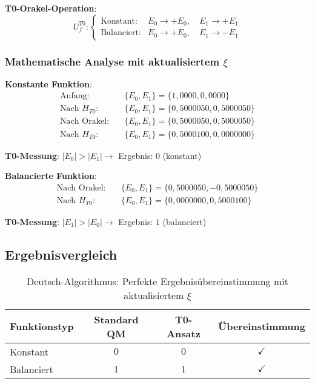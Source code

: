 \documentclass[12pt,a4paper]{article}
\newcommand{\Efield}{E}
\begin{document}
	\textbf{T0-Orakel-Operation}:
	\begin{equation}
		U_f^{T0}: \begin{cases}
			\text{Konstant}: & \Efield_0 \rightarrow +\Efield_0, \quad \Efield_1 \rightarrow +\Efield_1 \\
			\text{Balanciert}: & \Efield_0 \rightarrow +\Efield_0, \quad \Efield_1 \rightarrow -\Efield_1
		\end{cases}
	\end{equation}
	
	\subsubsection{Mathematische Analyse mit aktualisiertem $\xi$}
	
	\textbf{Konstante Funktion}:
	\begin{align}
		\text{Anfang}: \quad &\{\Efield_0, \Efield_1\} = \{1,0000, 0,0000\} \\
		\text{Nach } H_{T0}: \quad &\{\Efield_0, \Efield_1\} = \{0,5000050, 0,5000050\} \\
		\text{Nach Orakel}: \quad &\{\Efield_0, \Efield_1\} = \{0,5000050, 0,5000050\} \\
		\text{Nach } H_{T0}: \quad &\{\Efield_0, \Efield_1\} = \{0,5000100, 0,0000000\}
	\end{align}
	
	\textbf{T0-Messung}: $|\Efield_0| > |\Efield_1| \rightarrow$ Ergebnis: $0$ (konstant)
	
	\textbf{Balancierte Funktion}:
	\begin{align}
		\text{Nach Orakel}: \quad &\{\Efield_0, \Efield_1\} = \{0,5000050, -0,5000050\} \\
		\text{Nach } H_{T0}: \quad &\{\Efield_0, \Efield_1\} = \{0,0000000, 0,5000100\}
	\end{align}
	
	\textbf{T0-Messung}: $|\Efield_1| > |\Efield_0| \rightarrow$ Ergebnis: $1$ (balanciert)
	
	\subsection{Ergebnisvergleich}
	
	\begin{table}[htbp]
		\centering
		\begin{tabular}{lccc}
			\toprule
			\textbf{Funktionstyp} & \textbf{Standard QM} & \textbf{T0-Ansatz} & \textbf{Übereinstimmung} \\
			\midrule
			Konstant & $0$ & $0$ & $\checkmark$ \\
			Balanciert & $1$ & $1$ & $\checkmark$ \\
			\bottomrule
		\end{tabular}
		\caption{Deutsch-Algorithmus: Perfekte Ergebnisübereinstimmung mit aktualisiertem $\xi$}
	\end{table}
	
\end{document}
